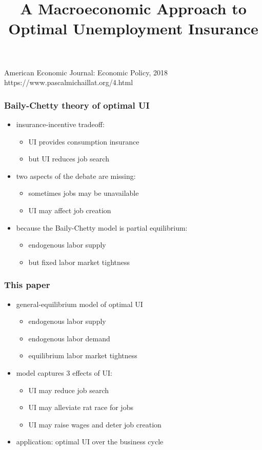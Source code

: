 \documentclass[12pt,xcolor={dvipsnames},hyperref={pdftex,pdfpagemode=UseNone,hidelinks,pdfdisplaydoctitle=true},usepdftitle=false]{beamer}
\begin{document}
\title{A Macroeconomic Approach to Optimal Unemployment Insurance}
%
{American Economic Journal: Economic Policy, 2018}%
{https://www.pascalmichaillat.org/4.html}
\frame[plain]{\titlepage}

\begin{frame}
\frametitle{Baily-Chetty theory of optimal UI}
\begin{itemize}
\item insurance-incentive tradeoff:
\begin{itemize}
\item UI provides consumption insurance
\item but UI reduces job search
\end{itemize}
\item two aspects of the debate are missing:
\begin{itemize}
\item sometimes jobs may be unavailable
\item UI may affect job creation
\end{itemize}
\item because the Baily-Chetty model is partial equilibrium:
\begin{itemize}
\item endogenous labor supply
\item but fixed labor market tightness
\end{itemize}
\end{itemize}
\end{frame}

\begin{frame}
\frametitle{This paper}
\begin{itemize}
\item general-equilibrium model of optimal UI 
\begin{itemize}
\item endogenous labor supply
\item endogenous labor demand
\item equilibrium labor market tightness
\end{itemize}
\item model captures 3 effects of UI:
\begin{itemize}
\item UI may reduce job search
\item UI may alleviate rat race for jobs
\item UI may raise wages and deter job creation
\end{itemize}
\item application: optimal UI over the business cycle
\end{itemize}
\end{frame}
\end{document}
